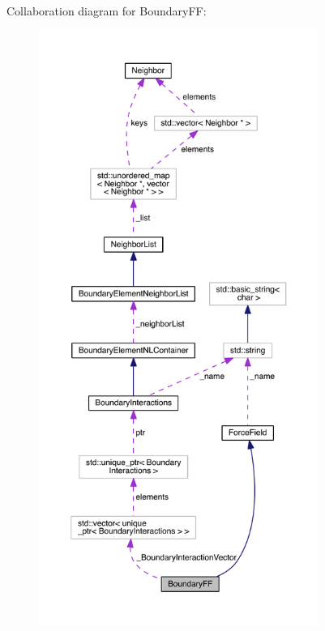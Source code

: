 Collaboration diagram for Boundary\+F\+F\+:\nopagebreak
\begin{figure}[H]
\begin{center}
\leavevmode
\includegraphics[height=550pt]{classBoundaryFF__coll__graph}
\end{center}
\end{figure}
